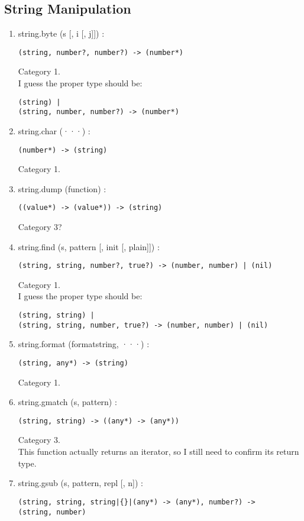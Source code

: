 \subsection{String Manipulation}

\begin{enumerate}
\item string.byte (s [, i [, j]]) :
\begin{verbatim}
(string, number?, number?) -> (number*)
\end{verbatim}
Category 1.
\\
I guess the proper type should be:
\begin{verbatim}
(string) |
(string, number, number?) -> (number*)
\end{verbatim}
\item string.char (···) :
\begin{verbatim}
(number*) -> (string)
\end{verbatim}
Category 1.
\item string.dump (function) :
\begin{verbatim}
((value*) -> (value*)) -> (string)
\end{verbatim}
Category 3?
\item string.find (s, pattern [, init [, plain]]) :
\begin{verbatim}
(string, string, number?, true?) -> (number, number) | (nil)
\end{verbatim}
Category 1.
\\
I guess the proper type should be:
\begin{verbatim}
(string, string) |
(string, string, number, true?) -> (number, number) | (nil)
\end{verbatim}
\item string.format (formatstring, ···) :
\begin{verbatim}
(string, any*) -> (string)
\end{verbatim}
Category 1.
\item string.gmatch (s, pattern) :
\begin{verbatim}
(string, string) -> ((any*) -> (any*))
\end{verbatim}
Category 3.
\\
This function actually returns an iterator,
so I still need to confirm its return type.
\item string.gsub (s, pattern, repl [, n]) :
\begin{verbatim}
(string, string, string|{}|(any*) -> (any*), number?) ->
(string, number)
\end{verbatim}

\end{enumerate}
